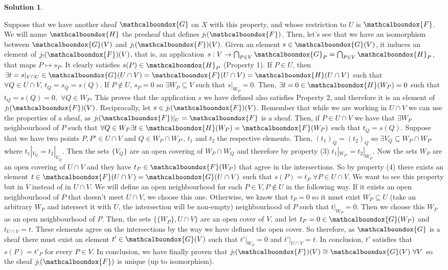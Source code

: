 \documentclass[12pt]{article}
\theoremstyle{definition}
\newtheorem*{sol}{Solution}
\newcommand{\sF}{\ensuremath{\mathcalboondox{F}}}
\newcommand{\sG}{\ensuremath{\mathcalboondox{G}}}
\newcommand{\sH}{\ensuremath{\mathcalboondox{H}}}
\begin{document}
\begin{sol}
\begin{enumerate}[label=\alph*)]
		Suppose that we have another sheaf $\sG$ on $X$ with this property, and whose restriction to $U$ is $\sF$. We will name $\sH$ the presheaf that defines $j_{!}(\sF)$. Then, let's see that we have an isomorphism between $\sG(V)$ and $j_{!}(\sF)(V)$. Given an element $s \in \sG(V)$, it induces an element of $j_{!}(\sF)(V)$, that is, an application $s: V \to \bigcap_{P \in V} \sG_P = \bigcap_{P \in V} \sH_P$, that maps $P \mapsto s_P$. It clearly satisfies $s(P) \in \sH_P$ (Property 1). If $P \in U$, then $\exists t = s|_{V \cap U} \in \sG(U \cap V) = \sF(U \cap V) = \sH(U \cap V)$ such that $\forall Q \in U \cap V, \, t_Q = s_Q = s(Q)$. If $P \notin U$, $s_P = 0$ so $\exists W_P \subseteq V$ such that $s|_{W_P} = 0$. Then, $\exists t = 0 \in \sH(W_P) = 0$ such that $t_Q = s(Q) = 0, \, \, \forall Q \in W_P$. This proves that the application $s$ we have defined also satisfies Property 2, and therefore it is an element of $j_{!}(\sF)(V)$. Reciprocally, let $s \in j_{!}(\sF)(V)$. Remember that while we are working in $U \cap V$ we can use the properties of a sheaf, as $j_{!}(\sF)|_U = \sF$ is a sheaf.  Then, if $P \in U \cap V$ we have that $\exists W_P$ neighbourhood of $P$ such that $\forall Q \in W_P \exists t \in \sH(W_P) = \sF(W_P)$ such that $t_Q = s(Q)$. Suppose that we have two points $P, P' \in U \cap V$ and $Q \in W_P \cap W_{P'}$, $t_1$ and $t_2$ the respective elements. Then, $(t_1)_Q = (t_2)_Q$ so $\exists V_{Q} \subseteq W_P \cap W_{P'}$ where $t_1|_{V_Q} = t_2|_{V_Q}$. Then the sets $\{V_Q\}$ are an open covering of $W_P \cap W_Q$ and therefore by property (3) $t_1|_{W_{P'}} = t_2|_{W_P}$. Now the sets $W_P$ are an open covering of $U \cap V$ and they have $t_P \in \sF(W_P)$ that agree in the intersections. So by property (4) there exists an element $t \in \sF(U \cap V) = \sG(U \cap V)$ such that $s(P) = t_P \, \, \forall P \in U \cap V$. We want to see this property but in $V$ instead of in $U \cap V$. We will define an open neighbourhood for each $P \in V, P \notin U$ in the following way. If it exists an open neighbourhood of $P$ that doesn't meet $U \cap V$, we choose this one. Otherwise, we know that $t_P = 0$ so it must exist $W_P \subseteq U$ (take an arbitrary $W_P$ and intersect it with $U$, the intersection will be non-empty) neighbourhood of $P$ such that $t|_{W_P} = 0$. Then we choose this $W_P$ as an open neighbourhood of $P$. Then, the sets $\{\{W_P\}, U \cap V\}$ are an open cover of $V$, and let $t_P = 0 \in \sG(W_P)$ and $t_{U \cap V} = t$. These elements agree on the intersections by the way we have defined the open cover. So therefore, as $\sG$ is a sheaf there must exist an element $t' \in \sG(V)$ such that $t'|_{W_P} = 0$ and $t'|_{U \cap V} = t$. In conclusion, $t'$ satisfies that $s(P) = t'_{P}$ for every $P \in V$. In conclusion, we have finally proven that $j_{!}(\sF)(V) \cong \sG(V) \, \, \forall V$ so the sheaf $j_{!}(\sF)$ is unique (up to isomorphism).


\end{enumerate}
\end{sol}
\end{document}

